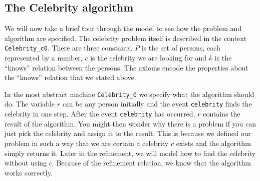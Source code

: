{\begin{description}
\begin{description}
		\AnyPrm
			\begin{description}
			\end{description}
		\WhereGrd
			\begin{description}
			\nItemX{ grd1 }{ x \in  R }
			\nItemX{ grd2 }{ x \mapsto  b \notin  k }
			\end{description}
		\Witnesses
			\begin{description}
			\nItem{ y }{ b=y }
			\end{description}
		\ThenAct
			\begin{description}
			\nItemX{ act2 }{ b :=  x }
			\nItemX{ act1 }{ R :=  R \setminus  \{ x\}  }
			\end{description}
		\EndAct
		\end{description}
\END
\end{description}
}
\subsection{The Celebrity algorithm}
\label{the_celebrity_algorithm}

We will now take a brief tour through the model to see how the problem and algorithm are specified.
The celebrity problem itself is described in the context \texttt{Celebrity\_c0}. There are
  three constants. $P$ is the set of persons, each represented by a number, $c$ is the celebrity
  we are looking for and $k$ is the ``knows'' relation between the persons.
The axioms encode the properties about the ``knows'' relation that we stated above.


In the most abstract machine \texttt{Celebrity\_0} we specify what the algorithm should do.
The variable $r$ can be any person initially and the event \texttt{celebrity} 
  finds the celebrity in one step. 
After the event \texttt{celebrity} has occurred, $r$ contains the result of the algorithm.
You might then wonder why there is a problem if you can just pick the celebrity and assign it to the result. This is because we defined our problem in such a way that we are certain a celebrity $c$ exists and the algorithm simply returns it.
Later in the refinement, we will model how to find the celebrity without using $c$.
Because of the refinement relation, we know that the algorithm works correctly.

